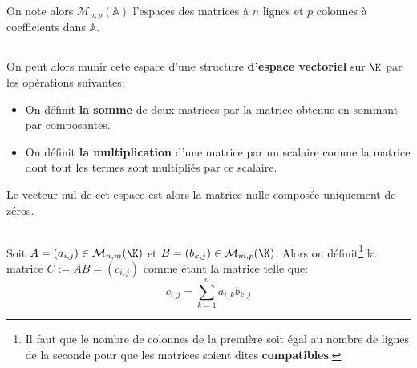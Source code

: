 On note alors \(\mathcal{M}_{n, p}(\mathbb{A})\) l'espaces des matrices à \( n \) lignes et \( p \) colonnes à coefficients dans \( \mathbb{A} \).

\subsection*{}
On peut alors munir cete espace d'une structure \textbf{d'espace vectoriel} sur \( \K \) par les opérations suivantes:
\begin{itemize}
   \item On définit \textbf{la somme} de deux matrices par la matrice obtenue en sommant par composantes.
   \item On définit \textbf{la multiplication} d'une matrice par un scalaire comme la matrice dont tout les termes sont multipliés par ce scalaire.
\end{itemize}
Le vecteur nul de cet espace est alors la matrice nulle composée uniquement de zéros.

\subsection*{}

Soit \(A = (a_{i, j}) \in \mathcal{M}_{n, m}(\K)\) et \(B = (b_{k, j}) \in \mathcal{M}_{m, p}(\K)\). Alors on définit\footnote[1]{Il faut que le nombre de colonnes de la première soit égal au nombre de lignes de la seconde pour que les matrices soient dites \textbf{compatibles}.}  la matrice \(C := AB = (c_{i,j})\) comme étant la matrice telle que:
\[
   c_{i, j} = \sum_{k=1}^{n}a_{i, k}b_{k, j}
\]


